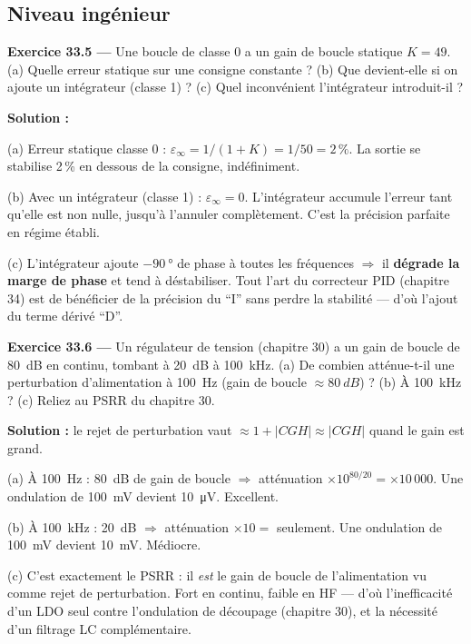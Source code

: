 \documentclass[12pt,a4paper,twoside]{book}
\begin{document}
\subsection*{Niveau ingénieur}

\textbf{Exercice 33.5 ---} Une boucle de classe 0 a un gain de boucle statique $K = 49$. (a) Quelle erreur statique sur une consigne constante ? (b) Que devient-elle si on ajoute un intégrateur (classe 1) ? (c) Quel inconvénient l'intégrateur introduit-il ?

\begin{pratique}
\textbf{Solution :}

(a) Erreur statique classe 0 : $\varepsilon_\infty = 1/(1+K) = 1/50 = 2\,\%$. La sortie se stabilise 2\,\% en dessous de la consigne, indéfiniment.

(b) Avec un intégrateur (classe 1) : $\varepsilon_\infty = 0$. L'intégrateur accumule l'erreur tant qu'elle est non nulle, jusqu'à l'annuler complètement. C'est la précision parfaite en régime établi.

(c) L'intégrateur ajoute $-\SI{90}{°}$ de phase à toutes les fréquences $\Rightarrow$ il \textbf{dégrade la marge de phase} et tend à déstabiliser. Tout l'art du correcteur PID (chapitre 34) est de bénéficier de la précision du ``I'' sans perdre la stabilité --- d'où l'ajout du terme dérivé ``D''.
\end{pratique}

\textbf{Exercice 33.6 ---} Un régulateur de tension (chapitre 30) a un gain de boucle de \SI{80}{dB} en continu, tombant à \SI{20}{dB} à \SI{100}{kHz}. (a) De combien atténue-t-il une perturbation d'alimentation à \SI{100}{Hz} (gain de boucle $\approx \SI{80}{dB}$) ? (b) À \SI{100}{kHz} ? (c) Reliez au PSRR du chapitre 30.

\begin{pratique}
\textbf{Solution :} le rejet de perturbation vaut $\approx 1+|CGH| \approx |CGH|$ quand le gain est grand.

(a) À \SI{100}{Hz} : \SI{80}{dB} de gain de boucle $\Rightarrow$ atténuation $\times 10^{80/20} = \times 10\,000$. Une ondulation de \SI{100}{mV} devient \SI{10}{\micro V}. Excellent.

(b) À \SI{100}{kHz} : \SI{20}{dB} $\Rightarrow$ atténuation $\times 10 = $ seulement. Une ondulation de \SI{100}{mV} devient \SI{10}{mV}. Médiocre.

(c) C'est exactement le PSRR : il \textit{est} le gain de boucle de l'alimentation vu comme rejet de perturbation. Fort en continu, faible en HF --- d'où l'inefficacité d'un LDO seul contre l'ondulation de découpage (chapitre 30), et la nécessité d'un filtrage LC complémentaire.
\end{pratique}
\end{document}

